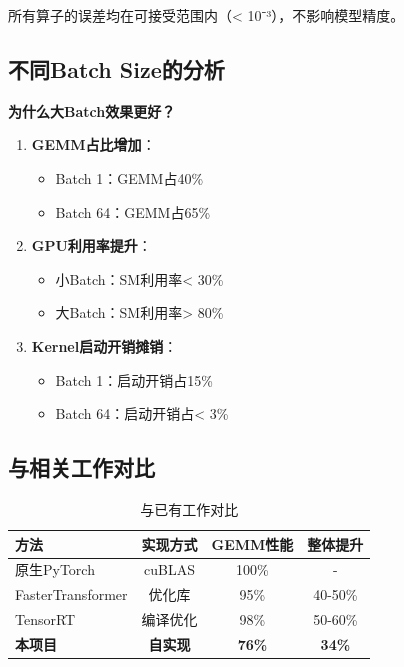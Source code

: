 \documentclass[12pt,a4paper]{article}
\begin{document}
所有算子的误差均在可接受范围内（< 10⁻³），不影响模型精度。

\subsection{不同Batch Size的分析}

\textbf{为什么大Batch效果更好？}

\begin{enumerate}
    \item \textbf{GEMM占比增加}：
    \begin{itemize}
        \item Batch 1：GEMM占40\%
        \item Batch 64：GEMM占65\%
    \end{itemize}
    
    \item \textbf{GPU利用率提升}：
    \begin{itemize}
        \item 小Batch：SM利用率< 30\%
        \item 大Batch：SM利用率> 80\%
    \end{itemize}
    
    \item \textbf{Kernel启动开销摊销}：
    \begin{itemize}
        \item Batch 1：启动开销占15\%
        \item Batch 64：启动开销占< 3\%
    \end{itemize}
\end{enumerate}

\subsection{与相关工作对比}

\begin{table}[H]
\centering
\caption{与已有工作对比}
\begin{tabular}{lccc}
\toprule
\textbf{方法} & \textbf{实现方式} & \textbf{GEMM性能} & \textbf{整体提升} \\
\midrule
原生PyTorch & cuBLAS & 100\% & - \\
FasterTransformer & 优化库 & 95\% & 40-50\% \\
TensorRT & 编译优化 & 98\% & 50-60\% \\
\midrule
\textbf{本项目} & \textbf{自实现} & \textbf{76\%} & \textbf{34\%} \\
\bottomrule
\end{tabular}
\end{table}
\end{document}

